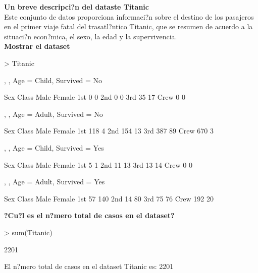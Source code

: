 \documentclass[6pt]{report}
\begin{document}
\textbf{Un breve descripci?n del dataste Titanic}\\
Este conjunto de datos proporciona informaci?n sobre el destino de los pasajeros en el primer viaje fatal del trasatl?ntico Titanic, que se resumen de acuerdo a la situaci?n econ?mica, el sexo, la edad y la supervivencia.\\

\textbf{Mostrar el dataset}
\begin{Schunk}
\begin{Sinput}
> Titanic
\end{Sinput}
\begin{Soutput}
, , Age = Child, Survived = No

      Sex
Class  Male Female
  1st     0      0
  2nd     0      0
  3rd    35     17
  Crew    0      0

, , Age = Adult, Survived = No

      Sex
Class  Male Female
  1st   118      4
  2nd   154     13
  3rd   387     89
  Crew  670      3

, , Age = Child, Survived = Yes

      Sex
Class  Male Female
  1st     5      1
  2nd    11     13
  3rd    13     14
  Crew    0      0

, , Age = Adult, Survived = Yes

      Sex
Class  Male Female
  1st    57    140
  2nd    14     80
  3rd    75     76
  Crew  192     20
\end{Soutput}
\end{Schunk}

\textbf{?Cu?l es el n?mero total de casos en el dataset?}
\begin{Schunk}
\begin{Sinput}
> sum(Titanic)
\end{Sinput}
\begin{Soutput}
[1] 2201
\end{Soutput}
\end{Schunk}
El n?mero total de casos en el dataset Titanic es: 2201
\end{document}
